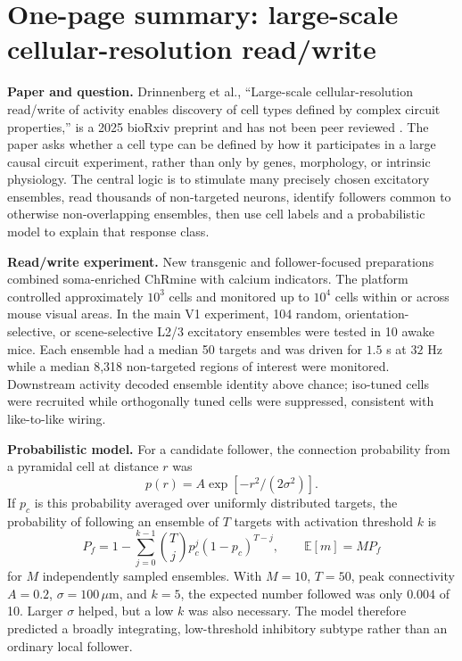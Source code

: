 \documentclass[11pt]{article}
\begin{document}
\clearpage
\appendix
\section{One-page summary: large-scale cellular-resolution read/write}
\label{app:drinnenberg}
\small
\textbf{Paper and question.}
Drinnenberg et al., ``Large-scale cellular-resolution read/write of activity
enables discovery of cell types defined by complex circuit properties,'' is a
2025 bioRxiv preprint and has not been peer reviewed
\cite{drinnenberg2025}.  The paper asks whether a cell type can be defined by
how it participates in a large causal circuit experiment, rather than only by
genes, morphology, or intrinsic physiology.  The central logic is to stimulate
many precisely chosen excitatory ensembles, read thousands of non-targeted
neurons, identify followers common to otherwise non-overlapping ensembles,
then use cell labels and a probabilistic model to explain that response class.

\textbf{Read/write experiment.}
New transgenic and follower-focused preparations combined soma-enriched
ChRmine with calcium indicators.  The platform controlled approximately
$10^3$ cells and monitored up to $10^4$ cells within or across mouse visual
areas.  In the main V1 experiment, 104 random, orientation-selective, or
scene-selective L2/3 excitatory ensembles were tested in 10 awake mice.  Each
ensemble had a median 50 targets and was driven for $1.5$ s at $32$ Hz while a
median 8,318 non-targeted regions of interest were monitored.  Downstream
activity decoded ensemble identity above chance; iso-tuned cells were
recruited while orthogonally tuned cells were suppressed, consistent with
like-to-like wiring.

\textbf{Probabilistic model.}
For a candidate follower, the connection probability from a pyramidal cell at
distance $r$ was
\begin{equation}
 p(r)=A\exp[-r^2/(2\sigma^2)].
\end{equation}
If $p_c$ is this probability averaged over uniformly distributed targets, the
probability of following an ensemble of $T$ targets with activation threshold
$k$ is
\begin{equation}
 P_f=1-\sum_{j=0}^{k-1}\binom{T}{j}p_c^j(1-p_c)^{T-j},
 \qquad \mathbb E[m]=M P_f
\end{equation}
for $M$ independently sampled ensembles.  With $M=10$, $T=50$, peak
connectivity $A=0.2$, $\sigma=100\,\mu$m, and $k=5$, the expected number
followed was only $0.004$ of 10.  Larger $\sigma$ helped, but a low $k$ was
also necessary.  The model therefore predicted a broadly integrating,
low-threshold inhibitory subtype rather than an ordinary local follower.
\end{document}
